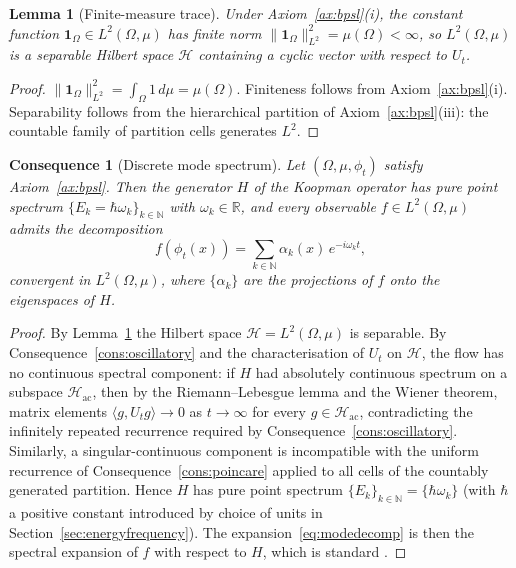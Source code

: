 \documentclass[11pt,twocolumn,a4paper]{article}
\theoremstyle{axiomstyle}
\theoremstyle{conseqstyle}
\newtheorem{consequence}{Consequence}
\newtheorem{lemma}{Lemma}
\theoremstyle{definition}
\theoremstyle{remark}
\newcommand{\Real}{\mathbb{R}}
\newcommand{\Natural}{\mathbb{N}}
\newcommand{\Hilbert}{\mathcal{H}}
\begin{document}
\begin{lemma}[Finite-measure trace]
\label{lem:tracefinite}
Under Axiom~\ref{ax:bpsl}(i), the constant function $\mathbf{1}_{\Omega}\in L^{2}(\Omega,\mu)$ has finite norm $\|\mathbf{1}_{\Omega}\|_{L^{2}}^{2}=\mu(\Omega)<\infty$, so $L^{2}(\Omega,\mu)$ is a separable Hilbert space $\Hilbert$ containing a cyclic vector with respect to $U_{t}$.
\end{lemma}
\begin{proof}
$\|\mathbf{1}_{\Omega}\|_{L^{2}}^{2}=\int_{\Omega}1\,d\mu=\mu(\Omega)$. Finiteness follows from Axiom~\ref{ax:bpsl}(i). Separability follows from the hierarchical partition of Axiom~\ref{ax:bpsl}(iii): the countable family of partition cells generates $L^{2}$.
\end{proof}

\begin{consequence}[Discrete mode spectrum]
\label{cons:discretemodes}
Let $(\Omega,\mu,\phi_{t})$ satisfy Axiom~\ref{ax:bpsl}. Then the generator $H$ of the Koopman operator has pure point spectrum $\{E_{k}=\hbar\omega_{k}\}_{k\in\Natural}$ with $\omega_{k}\in\Real$, and every observable $f\in L^{2}(\Omega,\mu)$ admits the decomposition
\begin{equation}
f(\phi_{t}(x))=\sum_{k\in\Natural}\alpha_{k}(x)\,e^{-i\omega_{k}t},
\label{eq:modedecomp}
\end{equation}
convergent in $L^{2}(\Omega,\mu)$, where $\{\alpha_{k}\}$ are the projections of $f$ onto the eigenspaces of $H$.
\end{consequence}

\begin{proof}
By Lemma~\ref{lem:tracefinite} the Hilbert space $\Hilbert=L^{2}(\Omega,\mu)$ is separable. By Consequence~\ref{cons:oscillatory} and the characterisation of $U_{t}$ on $\Hilbert$, the flow has no continuous spectral component: if $H$ had absolutely continuous spectrum on a subspace $\Hilbert_{\mathrm{ac}}$, then by the Riemann--Lebesgue lemma and the Wiener theorem, matrix elements $\langle g, U_{t}g\rangle\to 0$ as $t\to\infty$ for every $g\in\Hilbert_{\mathrm{ac}}$, contradicting the infinitely repeated recurrence required by Consequence~\ref{cons:oscillatory}. Similarly, a singular-continuous component is incompatible with the uniform recurrence of Consequence~\ref{cons:poincare} applied to all cells of the countably generated partition. Hence $H$ has pure point spectrum $\{E_{k}\}_{k\in\Natural}=\{\hbar\omega_{k}\}$ (with $\hbar$ a positive constant introduced by choice of units in Section~\ref{sec:energyfrequency}). The expansion~\eqref{eq:modedecomp} is then the spectral expansion of $f$ with respect to $H$, which is standard \citep{reed1980}.
\end{proof}
\end{document}
